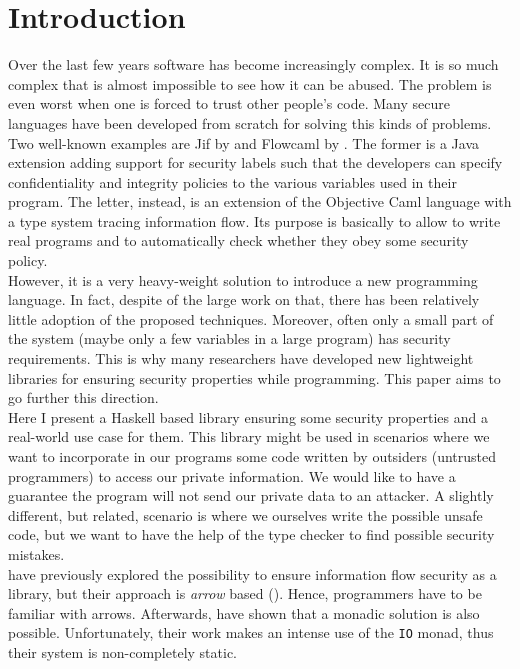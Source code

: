 \section{Introduction}
Over the last few years software has become increasingly complex. It is so much complex that is almost impossible to see how it can be abused. The problem is even worst when one is forced to trust other people's code. Many secure languages have been developed from scratch for solving this kinds of problems. Two well-known examples are Jif \cite{pullicino2014jif} by \citeauthor{pullicino2014jif} and Flowcaml \cite{simonet2003flow} by \citeauthor{simonet2003flow}. The former is a Java extension adding support for security labels such that the developers can specify confidentiality and integrity policies to the various variables used in their program. The letter, instead, is an extension of the Objective Caml language with a type system tracing information flow. Its purpose is basically to allow to write real programs and to automatically check whether they obey some security policy. \\
However, it is a very heavy-weight solution to introduce a new programming language. In fact, despite of the large work on that, there has been relatively little adoption of the proposed techniques. Moreover, often only a small part of the system (maybe only a few variables in a large program) has security requirements. This is why many researchers have developed new lightweight libraries for ensuring security properties while programming. This paper aims to go further this direction. \\
Here I present a Haskell based library ensuring some security properties and a real-world use case for them. This library might be used in scenarios where we want to incorporate in our programs some code written by outsiders (untrusted programmers) to access our private information. We would like to have a guarantee the program will not send our private data to an attacker. A slightly different, but related, scenario is where we ourselves write the possible unsafe code, but we want to have the help of the type checker to find possible security mistakes. \\
\citeauthor{li2006encoding} \cite{li2006encoding} have previously explored the possibility to ensure information flow security as a library, but their approach is \textit{arrow} based (\cite{hughes2000generalising}). Hence, programmers have to be familiar with arrows. Afterwards, \citeauthor{russo2008library} \cite{russo2008library} have shown that a monadic solution is also possible. Unfortunately, their work makes an intense use of the \texttt{IO} monad, thus their system is non-completely static. \\
